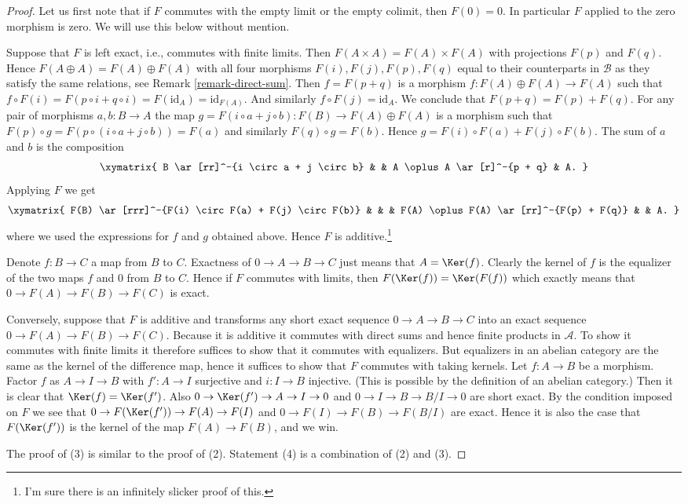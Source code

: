 \begin{proof}
Let us first note that if $F$ commutes with the empty limit or
the empty colimit, then $F(0) = 0$. In particular $F$ applied
to the zero morphism is zero. We will use this below without mention.

\medskip\noindent
Suppose that $F$ is left exact, i.e., commutes with finite limits.
Then $F(A \times A) = F(A) \times F(A)$ with
projections $F(p)$ and $F(q)$. Hence
$F(A \oplus A) = F(A) \oplus F(A)$ with all
four morphisms $F(i), F(j), F(p), F(q)$ equal to their
counterparts in $\mathcal{B}$ as they satisfy the same
relations, see Remark \ref{remark-direct-sum}.
Then $f = F(p + q)$ is a morphism $f : F(A) \oplus F(A) \to F(A)$
such that $f \circ F(i) = F(p \circ i + q \circ i) = F(\text{id}_A)
= \text{id}_{F(A)}$. And similarly $f \circ F(j) = \text{id}_A$.
We conclude that $F(p + q) = F(p) + F(q)$. For
any pair of morphisms $a, b : B \to A$ the map
$g = F(i \circ a + j \circ b) : F(B) \to F(A) \oplus F(A)$
is a morphism such that $F(p) \circ g =
F(p \circ (i \circ a + j \circ b)) = F(a)$ and similarly
$F(q) \circ g = F(b)$. Hence $g = F(i) \circ F(a) + F(j) \circ F(b)$.
The sum of $a$ and $b$ is the composition
$$
\xymatrix{
B \ar[rr]^-{i \circ a + j \circ b} & &
A \oplus A \ar[r]^-{p + q} & A.
}
$$
Applying $F$ we get
$$
\xymatrix{
F(B) \ar[rrr]^-{F(i) \circ F(a) + F(j) \circ F(b)} & & &
F(A) \oplus F(A) \ar[rr]^-{F(p) + F(q)} & &
A.
}
$$
where we used the expressions for $f$ and $g$ obtained above.
Hence $F$ is additive.\footnote{I'm sure there is an infinitely
slicker proof of this.}

\medskip\noindent
Denote $f : B \to C$ a map from $B$ to $C$.
Exactness of $0 \to A \to B \to C$ just means that
$A = \Ker(f)$. Clearly the kernel of $f$ is
the equalizer of the two maps $f$ and $0$ from $B$ to $C$.
Hence if $F$ commutes with limits, then $F(\Ker(f))
= \Ker(F(f))$ which exactly means that
$0 \to F(A) \to F(B) \to F(C)$ is exact.

\medskip\noindent
Conversely, suppose that $F$ is additive and
transforms any short exact sequence $0 \to A \to B \to C$ into
an exact sequence $0 \to F(A) \to F(B) \to F(C)$.
Because it is additive it commutes with direct sums
and hence finite products in $\mathcal{A}$. To show
it commutes with finite limits it therefore
suffices to show that it commutes with
equalizers. But equalizers in an abelian category
are the same as the kernel of the difference map,
hence it suffices to show that $F$ commutes with
taking kernels. Let $f : A \to B$ be a morphism.
Factor $f$ as $A \to I \to B$ with $f' : A \to I$ surjective
and $i : I \to B$ injective. (This is possible by the
definition of an abelian category.) Then it is
clear that $\Ker(f) = \Ker(f')$. Also
$0 \to \Ker(f') \to A \to I \to 0$
and
$0 \to I \to B \to B/I \to 0$
are short exact. By the condition imposed on $F$
we see that
$0 \to F(\Ker(f')) \to F(A) \to F(I)$
and
$0 \to F(I) \to F(B) \to F(B/I)$
are exact. Hence it is also the case that
$F(\Ker(f'))$ is the kernel of the map
$F(A) \to F(B)$, and we win.

\medskip\noindent
The proof of (3) is similar to the proof of (2).
Statement (4) is a combination of (2) and (3).
\end{proof}

